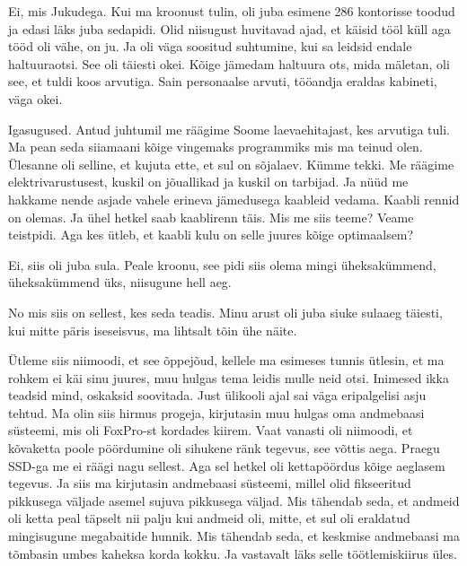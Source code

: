 Ei, mis Jukudega. Kui ma kroonust tulin, oli juba esimene  286  kontorisse 
toodud ja edasi läks juba sedapidi. Olid niisugust huvitavad ajad, et käisid  
tööl küll aga tööd oli  vähe, on ju.  Ja oli väga soositud suhtumine, kui sa 
leidsid endale haltuuraotsi. See oli täiesti okei. Kõige jämedam haltuura ots, 
mida mäletan, oli see, et tuldi koos arvutiga. Sain personaalse arvuti, 
tööandja eraldas kabineti, väga okei. 


Igasugused. Antud juhtumil me räägime Soome laevaehitajast, kes arvutiga tuli. 
Ma pean seda siiamaani kõige vingemaks programmiks mis ma teinud olen. Ülesanne 
oli selline, et kujuta ette, et sul on sõjalaev. Kümme tekki. Me räägime 
elektrivarustusest, kuskil on jõuallikad ja kuskil on tarbijad. Ja nüüd me 
hakkame nende asjade vahele erineva jämedusega kaableid vedama. Kaabli rennid 
on olemas. Ja ühel hetkel saab kaablirenn täis. Mis me siis teeme? Veame 
teistpidi. Aga kes ütleb, et kaabli kulu on selle juures kõige optimaalsem? 


Ei, siis oli juba sula. Peale kroonu, see pidi siis olema mingi üheksakümmend, 
üheksakümmend üks, niisugune hell aeg.


No mis siis on sellest, kes seda teadis. Minu arust oli juba siuke sulaaeg 
täiesti, kui mitte päris iseseisvus, ma lihtsalt tõin ühe näite. 


Ütleme siis niimoodi, et see õppejõud, kellele ma esimeses tunnis ütlesin, et 
ma rohkem ei käi sinu juures, muu hulgas tema leidis mulle neid otsi. Inimesed 
ikka teadsid mind,  oskaksid soovitada. Just ülikooli ajal sai väga 
eripalgelisi asju tehtud. Ma olin siis hirmus progeja, kirjutasin muu hulgas 
oma andmebaasi süsteemi, mis oli FoxPro-st  kordades kiirem. Vaat vanasti oli 
niimoodi, et kõvaketta poole pöördumine oli sihukene ränk tegevus, see võttis 
aega. Praegu SSD-ga me ei räägi nagu sellest. Aga sel hetkel oli kettapöördus 
kõige aeglasem tegevus. Ja siis ma kirjutasin andmebaasi süsteemi, millel olid 
fikseeritud pikkusega väljade asemel  sujuva pikkusega väljad. Mis tähendab 
seda, et andmeid oli ketta peal täpselt nii palju kui andmeid oli, mitte, et 
sul oli eraldatud mingisugune megabaitide hunnik. Mis tähendab seda, et 
keskmise andmebaasi ma tõmbasin umbes kaheksa korda kokku. Ja vastavalt läks 
selle töötlemiskiirus  üles.

